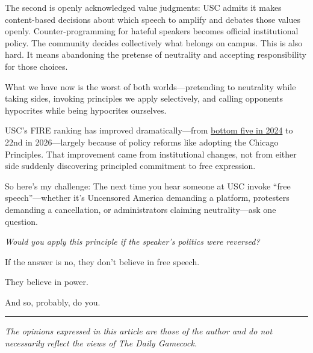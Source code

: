 \documentclass[11pt]{article}
\begin{document}
The second is openly acknowledged value judgments: USC admits it makes content-based decisions about which speech to amplify and debates those values openly. Counter-programming for hateful speakers becomes official institutional policy. The community decides collectively what belongs on campus. This is also hard. It means abandoning the pretense of neutrality and accepting responsibility for those choices.

What we have now is the worst of both worlds---pretending to neutrality while taking sides, invoking principles we apply selectively, and calling opponents hypocrites while being hypocrites ourselves.

USC's FIRE ranking has improved dramatically---from \href{https://thefire.org/sites/default/files/2024-09/2025\%20CFSR\%20Spotlight\%20-\%20U\%20of\%20South\%20Carolina.pdf}{bottom five in 2024} to 22nd in 2026---largely because of policy reforms like adopting the Chicago Principles. That improvement came from institutional changes, not from either side suddenly discovering principled commitment to free expression.

So here's my challenge: The next time you hear someone at USC invoke ``free speech''---whether it's Uncensored America demanding a platform, protesters demanding a cancellation, or administrators claiming neutrality---ask one question.

\textit{Would you apply this principle if the speaker's politics were reversed?}

If the answer is no, they don't believe in free speech.

They believe in power.

And so, probably, do you.

\vspace{0.5cm}
\hrule
\vspace{0.3cm}
{\small\textit{The opinions expressed in this article are those of the author and do not necessarily reflect the views of The Daily Gamecock.}}
\end{document}
